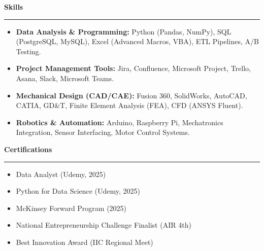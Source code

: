 \documentclass[9pt,letterpaper]{article} %
\newenvironment{rSection}[1]{ %
  \sectionskip
 \textbf{\Large #1} %
  \sectionlineskip
  \hrule %
  \begin{list}{}{ %
    \setlength{\leftmargin}{-0em} %
  }
  \item[]
}{
  \end{list}
}
\def\sectionlineskip{\smallskip} %
\def\sectionskip{} %
\begin{document}
\begin{rSection}{Skills}
\item[] \vspace{-0.5em}
\begin{itemize}[left=-1.5em, labelsep=.1cm, labelwidth=.2cm, itemsep=0.0em]

    \item \textbf{ Data Analysis \& Programming:} Python (Pandas, NumPy), SQL (PostgreSQL, MySQL), Excel (Advanced Macros, VBA), ETL Pipelines, A/B Testing.

    \item \textbf{ Project Management Tools:} Jira, Confluence, Microsoft Project, Trello, Asana, Slack, Microsoft Teams.

    \item \textbf{ Mechanical Design (CAD/CAE):} Fusion 360, SolidWorks, AutoCAD, CATIA, GD\&T, Finite Element Analysis (FEA), CFD (ANSYS Fluent).

    \item \textbf{ Robotics \& Automation:} Arduino, Raspberry Pi, Mechatronics Integration, Sensor Interfacing, Motor Control Systems.

\end{itemize}
\end{rSection}

\begin{rSection}{Certifications}
\item[] \vspace{-1em}
\begin{itemize}[left=-1.5em, labelsep=.1cm, labelwidth=.2cm, itemsep=0.0em]

\item Data Analyst (Udemy, 2025)

\item Python for Data Science (Udemy, 2025)

\item McKinsey Forward Program (2025)

\item National Entrepreneurship Challenge Finalist (AIR 4th)

\item Best Innovation Award (IIC Regional Meet)

\end{itemize}
\end{rSection}
\end{document}
